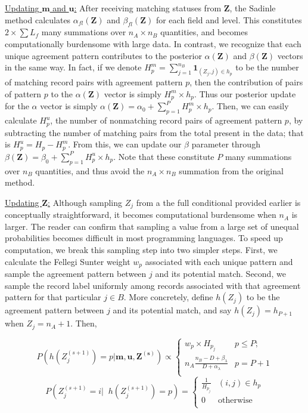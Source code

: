 \documentclass[12pt,letterpaper]{article}
\newcommand{\1}[1]{\mathbb{I}\!\left[#1\right]} %
\begin{document}
\underline{Updating $\mathbf{m}$ and $\mathbf{u}$:} After receiving
matching statuses from \(\mathbf{Z}\), the Sadinle method calculates
\(\alpha_{fl}(\mathbf{Z})\) and \(\beta_{fl}(\mathbf{Z})\) for each
field and level. This constitutes \(2 \times \sum L_f\) many summations
over \(n_A \times n_B\) quantities, and becomes computationally
burdensome with large data. In contrast, we recognize that each unique
agreement pattern contributes to the posterior \(\alpha(\mathbf{Z})\)
and \(\beta(\mathbf{Z})\) vectors in the same way. In fact, if we denote
\(H_p^m = \sum_{j=1}^{n_B} \mathbf{1}_{(Z_j, j) \in h_p}\) to be the
number of matching record pairs with agreement pattern \(p\), then the
contribution of pairs of pattern \(p\) to the \(\alpha(\mathbf{Z})\)
vector is simply \(H_p^m \times h_p\). Thus our posterior update for the
\(\alpha\) vector is simply
\(\alpha(\mathbf{Z}) = \alpha_0 + \sum_{p=1}^P H_p^m \times h_p\). Then,
we can easily calculate \(H_p^u\), the number of nonmatching record
pairs of agreement pattern \(p\), by subtracting the number of matching
pairs from the total present in the data; that is
\(H_p^u = H_p - H_p^m\). From this, we can update our \(\beta\)
parameter through
\(\beta(\mathbf{Z}) = \beta_0 + \sum_{p=1}^P H_p^u \times h_p\). Note
that these constitute \(P\) many summations over \(n_B\) quantities, and
thus avoid the \(n_A \times n_B\) summation from the original method.

\underline{Updating $\mathbf{Z}$:} Although sampling \(Z_j\) from a the
full conditional provided earlier is conceptually straightforward, it
becomes computational burdensome when \(n_A\) is larger. The reader can
confirm that sampling a value from a large set of unequal probabilities
becomes difficult in most programming languages. To speed up
computation, we break this sampling step into two simpler steps. First,
we calculate the Fellegi Sunter weight \(w_{p}\) associated with each
unique pattern and sample the agreement pattern between \(j\) and its
potential match. Second, we sample the record label uniformly among
records associated with that agreement pattern for that particular
\(j\in B\). More concretely, define \(h(Z_j)\) to be the agreement
pattern between \(j\) and its potential match, and say
\(h(Z_j) = h_{P+1}\) when \(Z_j = n_A + 1\). Then,

\[P\left(h\left(Z_j^{(s+1)}\right) = p | \mathbf{m}, \mathbf{u}, \mathbf{Z^{(s)}}\right) \propto
\begin{cases} 
	w_{p}\times H_{p_j}  & p \leq P; \\
	n_A \frac{n_B - D + \beta_{\lambda}}{D + \alpha_{\lambda}} &   p = P + 1 \\
\end{cases}\]
\[P\left(Z_j^{(s+1)} = i\bigg|\;\; h\left(Z_j^{(s+1)}\right) = p\right) = \begin{cases} 
	\frac{1}{H_{p_j}} & (i, j) \in h_p \\
	0 & \text{otherwise} \\
\end{cases}\]
\end{document}
